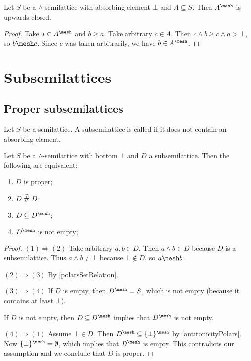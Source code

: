 \begin{lemma} \label{grillUpwardsClosed}
Let $S$ be a $\wedge$-semilattice with absorbing element $\bot$ and $A\subseteq S$. Then $A^\mesh$ is upwards closed.
\end{lemma}
\begin{proof}
Take $a\in A^\mesh$ and $b \geq a$. Take arbitrary $c\in A$. Then $c\wedge b \geq c\wedge a > \bot$, so $b\mesh c$. Since $c$ was taken arbitrarily, we have $b\in A^\mesh$.
\end{proof}

\section{Subsemilattices}
\subsection{Proper subsemilattices}
\begin{definition}
Let $S$ be a semilattice. A subsemilattice is called  if it does not contain an absorbing element.
\end{definition}

\begin{lemma} \label{properSubsemilatticeLemma}
Let $S$ be a $\wedge$-semilattice with bottom $\bot$ and $D$ a subsemilattice. Then the following are equivalent:
\begin{enumerate}
\item $D$ is proper;
\item $D\mathrel{\widehat{\#}} D$;
\item $D\subseteq D^\mesh$;
\item $D^\mesh$ is not empty;
\end{enumerate}
\end{lemma}
\begin{proof}
$(1) \Rightarrow (2)$ Take arbitrary $a,b\in D$. Then $a\wedge b\in D$ because $D$ is a subsemilattice. Thus $a\wedge b \neq \bot$ because $\bot\notin D$, so $a\mesh b$.

$(2) \Rightarrow (3)$ By \ref{polarsSetRelation}.

$(3) \Rightarrow (4)$ If $D$ is empty, then $D^\mesh = S$, which is not empty (because it contains at least $\bot$). 

If $D$ is not empty, then $D\subseteq D^\mesh$ implies that $D^\mesh$ is not empty.

$(4) \Rightarrow (1)$ Assume $\bot\in D$. Then $D^\mesh \subseteq \{\bot\}^\mesh$ by \ref{antitonicityPolars}. Now $\{\bot\}^\mesh = \emptyset$, which implies that $D^\mesh$ is empty. This contradicts our assumption and we conclude that $D$ is proper.
\end{proof}

